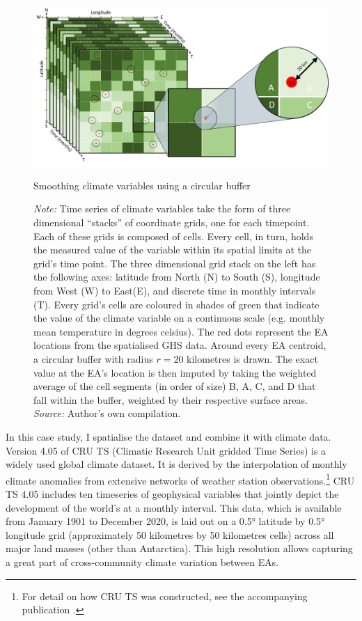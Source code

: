 \documentclass[a4paper,12pt]{article}
\theoremstyle{plain}
\theoremstyle{definition}
\theoremstyle{definition}
\theoremstyle{definition}
\theoremstyle{definition}
\begin{document}
\begin{figure}[t!]
    \centering
    \includegraphics[scale=0.33]{../outputs/buffer.JPG}
    \caption{Smoothing climate variables using a circular buffer}
    \caption*{\footnotesize{\textit{Note:} Time series of climate variables take the form of three dimensional ``stacks'' of coordinate grids, one for each timepoint. Each of these grids is composed of cells. Every cell, in turn, holds the measured value of the variable within its spatial limits at the grid's time point. The three dimensional grid stack on the left has the following axes: latitude from North (N) to South (S), longitude from West (W) to East(E), and discrete time in monthly intervals (T). Every grid's cells are coloured in shades of green that indicate the value of the climate variable on a continuous scale (e.g. monthly mean temperature in degrees celsius). The red dots represent the EA locations from the spatialised GHS data. Around every EA centroid, a circular buffer with radius $r=20$ kilometres is drawn. The exact value at the EA's location is then imputed by taking the weighted average of the cell segments (in order of size) B, A, C, and D that fall within the buffer, weighted by their respective surface areas. \textit{Source:} Author's own compilation.}}
    \label{fig:buffer}
\end{figure}

In this case study, I spatialise the dataset and combine it with climate data. Version 4.05 of CRU TS (Climatic Research Unit gridded Time Series) is a widely used global climate dataset. It is derived by the interpolation of monthly climate anomalies from extensive networks of weather station observations.\footnote{For detail on how CRU TS was constructed, see the accompanying publication \citep{harris2020}.} CRU TS 4.05 includes ten timeseries of geophysical variables that jointly depict the development of the world's at a monthly interval. This data, which is available from January 1901 to December 2020, is laid out on a 0.5° latitude by 0.5° longitude grid (approximately 50 kilometres by 50 kilometres cells) across all major land masses (other than Antarctica). This high resolution allows capturing a great part of cross-community climate variation between EAs.
\end{document}
